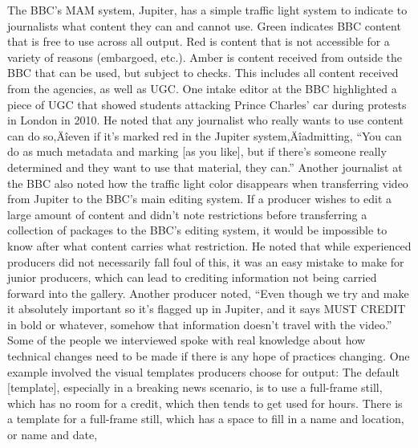 \documentclass[symmetric, notoc, nobib]{towcenter-book}
\begin{document}
\begin{enumerate}
The BBC's MAM system, Jupiter, has a simple traffic light system to indicate
to journalists what content they can and cannot use. Green indicates BBC
content that is free to use across all output. Red is content that is not accessible
for a variety of reasons (embargoed, etc.). Amber is content received
from outside the BBC that can be used, but subject to checks. This includes
all content received from the agencies, as well as UGC.
One intake editor at the BBC highlighted a piece of UGC that showed students
attacking Prince Charles' car during protests in London in 2010. He
noted that any journalist who really wants to use content can do so‚Äîeven
if it's marked red in the Jupiter system‚Äîadmitting, ``You can do as much
metadata and marking [as you like], but if there's someone really determined
and they want to use that material, they can.''
Another journalist at the BBC also noted how the traffic light color disappears
when transferring video from Jupiter to the BBC's main editing system.
If a producer wishes to edit a large amount of content and didn't note
restrictions before transferring a collection of packages to the BBC's editing
system, it would be impossible to know after what content carries what
restriction. He noted that while experienced producers did not necessarily
fall foul of this, it was an easy mistake to make for junior producers, which
can lead to crediting information not being carried forward into the gallery.
Another producer noted, ``Even though we try and make it absolutely
important so it's flagged up in Jupiter, and it says MUST CREDIT in bold or
whatever, somehow that information doesn't travel with the video.''
Some of the people we interviewed spoke with real knowledge about how
technical changes need to be made if there is any hope of practices changing.
One example involved the visual templates producers choose for output:
The default [template], especially in a breaking news scenario, is to
use a full-frame still, which has no room for a credit, which then
tends to get used for hours. There is a template for a full-frame still,
which has a space to fill in a name and location, or name and date,


\end{enumerate}
\end{document}
